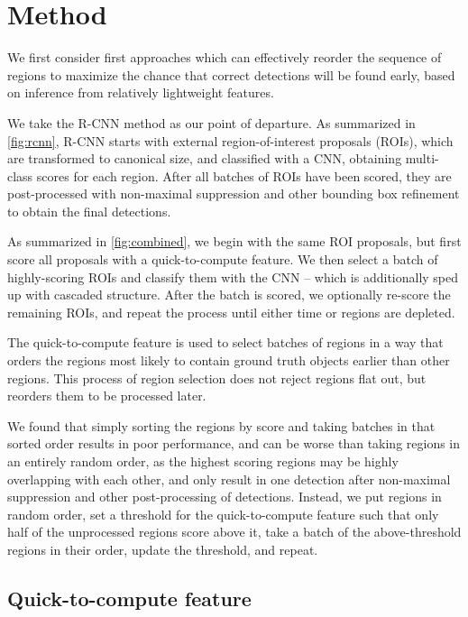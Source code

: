 \section{Method}\label{sec:method}

We first consider first approaches which can effectively reorder the sequence of regions to maximize the chance that correct detections will be found early, based on inference from relatively lightweight features.

We take the R-CNN \cite{Girshick-CVPR-2014} method as our point of departure.
As summarized in \autoref{fig:rcnn}, R-CNN starts with external region-of-interest proposals (ROIs), which are transformed to canonical size, and classified with a CNN, obtaining multi-class scores for each region.
After all batches of ROIs have been scored, they are post-processed with non-maximal suppression and other bounding box refinement to obtain the final detections.

As summarized in \autoref{fig:combined}, we begin with the same ROI proposals, but first score all proposals with a quick-to-compute feature.
We then select a batch of highly-scoring ROIs and classify them with the CNN -- which is additionally sped up with cascaded structure.
After the batch is scored, we optionally re-score the remaining ROIs, and repeat the process until either time or regions are depleted.

The quick-to-compute feature is used to select batches of regions in a way that orders the regions most likely to contain ground truth objects earlier than other regions.
This process of region selection does not reject regions flat out, but reorders them to be processed later.

We found that simply sorting the regions by score and taking batches in that sorted order results in poor performance, and can be worse than taking regions in an entirely random order, as the highest scoring regions may be highly overlapping with each other, and only result in one detection after non-maximal suppression and other post-processing of detections.
Instead, we put regions in random order, set a threshold for the quick-to-compute feature such that only half of the unprocessed regions score above it, take a batch of the above-threshold regions in their order, update the threshold, and repeat.





\subsection{Quick-to-compute feature}

